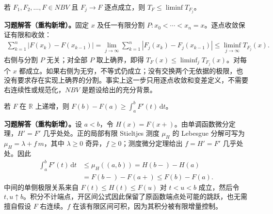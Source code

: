 \documentclass[../../main.tex]{subfiles}%
\begin{document}
\begin{exercise}\label{exercise:ch03-variation-lower-semicontinuity}
若 $F_1,F_2,\ldots,F\in NBV$ 且 $F_j\to F$ 逐点成立，则 $T_F\le\liminf T_{F_j}$。
\end{exercise}
\begin{solution}
\label{solution:ch03-variation-lower-semicontinuity}
\textbf{习题解答（重构新增）。}固定 $x$ 及任一有限分割 $P:x_0<\cdots<x_n=x$。逐点收敛保证有限和收敛：
\begin{align*}
\sum_{k=1}^n|F(x_k)-F(x_{k-1})|
=\lim_{j\to\infty}\sum_{k=1}^n|F_j(x_k)-F_j(x_{k-1})|
\le\liminf_{j\to\infty}T_{F_j}(x).
\end{align*}
右侧与分割 $P$ 无关；对全部 $P$ 取上确界，即得 $T_F(x)\le\liminf_jT_{F_j}(x)$。对每个 $x$ 都成立。如果右侧为无穷，不等式仍成立；没有交换两个无依据的极限，也没有要求存在实现上确界的分割。事实上这一步只用逐点收敛和变差定义，不需要右连续性或规范化，$NBV$ 是题设给出的充分背景。
\end{solution}

\begin{exercise}\label{exercise:ch03-monotone-integral-bound}
若 $F$ 在 $\mathbb R$ 上递增，则 $F(b)-F(a)\ge\int_a^bF'(t)\,\mathrm dt$。
\end{exercise}
\begin{solution}
\label{solution:ch03-monotone-integral-bound}
\textbf{习题解答（重构新增）。}设 $a<b$，令 $H(x)=F(x+)$。由单调函数微分定理，$H'=F'$ 几乎处处。正的局部有限 Stieltjes 测度 $\mu_H$ 的 Lebesgue 分解可写为 $\mu_H=\lambda+f\,m$，其中 $\lambda\ge0$ 奇异，$f\ge0$；测度微分定理给出 $f=H'=F'$ 几乎处处。因此
\begin{align*}
\int_a^bF'(t)\,\mathrm dt
&\le\mu_H((a,b))=H(b-)-H(a)\\
&=F(b-)-F(a+)\le F(b)-F(a).
\end{align*}
中间的单侧极限关系来自 $F(t)\le H(t)\le F(u)$ 对 $t<u<b$ 成立，然后令 $t,u\uparrow b$。积分不计端点，开区间公式因此保留了原函数端点处可能的跳跃，也无需擅自假设 $F$ 右连续。$f$ 在该有限区间可积，因为其积分被有限增量控制。
\end{solution}
\end{document}
